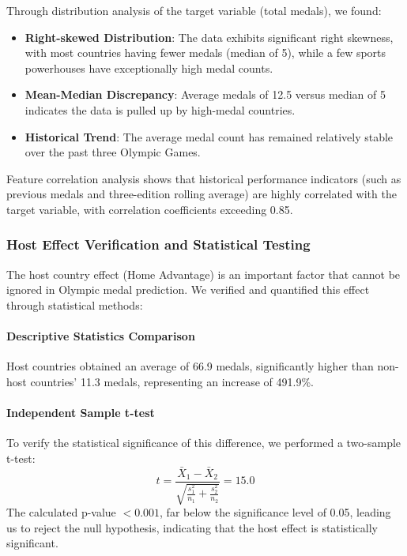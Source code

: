 \documentclass{mcmthesis}
\begin{document}
Through distribution analysis of the target variable (total medals), we found:
\begin{itemize}
    \item \textbf{Right-skewed Distribution}: The data exhibits significant right skewness, with most countries having fewer medals (median of 5), while a few sports powerhouses have exceptionally high medal counts.
    \item \textbf{Mean-Median Discrepancy}: Average medals of 12.5 versus median of 5 indicates the data is pulled up by high-medal countries.
    \item \textbf{Historical Trend}: The average medal count has remained relatively stable over the past three Olympic Games.
\end{itemize}

Feature correlation analysis shows that historical performance indicators (such as previous medals and three-edition rolling average) are highly correlated with the target variable, with correlation coefficients exceeding 0.85.

\subsubsection{Host Effect Verification and Statistical Testing}

The host country effect (Home Advantage) is an important factor that cannot be ignored in Olympic medal prediction. We verified and quantified this effect through statistical methods:

\paragraph{Descriptive Statistics Comparison}
Host countries obtained an average of 66.9 medals, significantly higher than non-host countries' 11.3 medals, representing an increase of 491.9\%.

\paragraph{Independent Sample t-test}
To verify the statistical significance of this difference, we performed a two-sample t-test:
\begin{equation}
    t = \frac{\bar{X}_1 - \bar{X}_2}{\sqrt{\frac{s_1^2}{n_1} + \frac{s_2^2}{n_2}}} = 15.0
\end{equation}
The calculated p-value $< 0.001$, far below the significance level of 0.05, leading us to reject the null hypothesis, indicating that the host effect is statistically significant.
\end{document}
